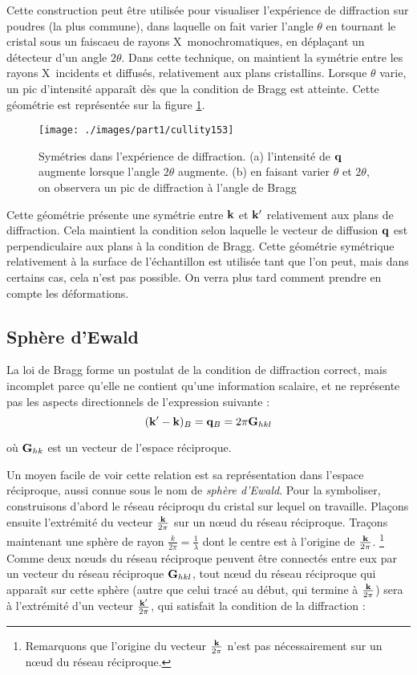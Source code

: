 Cette construction peut être utilisée pour visualiser l'expérience de diffraction sur poudres (la plus commune), dans laquelle on fait varier l'angle $\theta$ en tournant le cristal sous un faiscaeu de rayons X monochromatiques, en déplaçant un détecteur d'un angle $2\theta$. Dans cette technique, on maintient la symétrie entre les rayons X incidents et diffusés, relativement aux plans cristallins. Lorsque $\theta$ varie, un pic d'intensité apparaît dès que la condition de Bragg est atteinte. Cette géométrie est représentée sur la figure \ref{fig:braggangle}.

\begin{figure}
    \texttt{[image: ./images/part1/cullity153]}
    \caption{Symétries dans l'expérience de diffraction. (a) l'intensité de $\mathbf{q}$ augmente lorsque l'angle $2\theta$ augmente. (b) en faisant varier $\theta$ et $2\theta$, on observera un pic de diffraction à l'angle de Bragg}
    \label{fig:braggangle}
\end{figure}

Cette géométrie présente une symétrie entre $\mathbf{k}$ et $\mathbf{k'}$ relativement aux
plans de diffraction. Cela maintient la condition selon laquelle le vecteur de diffusion $\mathbf{q}$ est perpendiculaire aux plans à la condition de Bragg. Cette géométrie symétrique relativement à la surface de l'échantillon est utilisée tant que l'on peut, mais dans certains cas, cela n'est pas possible. On verra plus tard comment prendre en compte les déformations.

\subsection{Sphère d'Ewald}

La loi de Bragg forme un postulat de la condition de diffraction correct, mais
incomplet parce qu'elle ne contient qu'une information scalaire, et ne représente pas les aspects directionnels de l'expression suivante :
\begin{equation}
    (\mathbf{k'-k})_B = \mathbf{q}_B = 2\pi \mathbf{G}_{hkl}
\end{equation}

où $\mathbf{G}_{hk}$ est un vecteur de l'espace réciproque.

Un moyen facile de voir cette relation est sa représentation dans l'espace
réciproque, aussi connue sous le nom de \emph{sphère d'Ewald}. Pour la symboliser, construisons d'abord le réseau réciproqu du cristal sur lequel on travaille. Plaçons ensuite l'extrémité du vecteur $\frac{\mathbf{k}}{2\pi}$ sur un nœud du réseau réciproque. Traçons maintenant une sphère de rayon $\frac{k}{2\pi} = \frac{1}{\lambda}$ dont le centre est à l'origine de $\frac{\mathbf{k}}{2\pi}$.
\footnote{Remarquons que l'origine du vecteur $\frac{\mathbf{k}}{2\pi}$ n'est
pas nécessairement sur un nœud du réseau réciproque.}
Comme deux nœuds du réseau réciproque peuvent être connectés entre eux par un
vecteur du réseau réciproque $\mathbf{G}_{hkl}$, tout nœud du réseau réciproque
qui apparaît sur cette sphère (autre que celui tracé au début, qui termine à
$\frac{\mathbf{k}}{2\pi}$) sera à l'extrémité d'un vecteur
$\frac{\mathbf{k'}}{2\pi}$, qui satisfait la condition de la diffraction :

